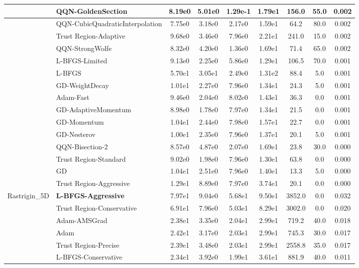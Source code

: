 \documentclass[10pt]{article}
\begin{document}
\begin{longtable}{|l|l|c|c|c|c|c|c|c|}
 & QQN-GoldenSection & 8.19e0 & 5.01e0 & 1.29e-1 & 1.79e1 & 156.0 & 55.0 & 0.002 \\
\hline
 & QQN-CubicQuadraticInterpolation & 7.75e0 & 3.18e0 & 2.17e0 & 1.59e1 & 64.2 & 80.0 & 0.002 \\
\hline
 & Trust Region-Adaptive & 9.68e0 & 3.46e0 & 7.96e0 & 2.21e1 & 241.0 & 15.0 & 0.002 \\
\hline
 & QQN-StrongWolfe & 8.32e0 & 4.20e0 & 1.36e0 & 1.69e1 & 71.4 & 65.0 & 0.002 \\
\hline
 & L-BFGS-Limited & 9.13e0 & 2.25e0 & 5.86e0 & 1.29e1 & 106.5 & 70.0 & 0.001 \\
\hline
 & L-BFGS & 5.70e1 & 3.05e1 & 2.49e0 & 1.31e2 & 88.4 & 5.0 & 0.001 \\
\hline
 & GD-WeightDecay & 1.01e1 & 2.27e0 & 7.96e0 & 1.34e1 & 24.3 & 5.0 & 0.001 \\
\hline
 & Adam-Fast & 9.46e0 & 2.04e0 & 8.02e0 & 1.43e1 & 36.3 & 0.0 & 0.001 \\
\hline
 & GD-AdaptiveMomentum & 8.98e0 & 1.78e0 & 7.97e0 & 1.34e1 & 21.5 & 0.0 & 0.001 \\
\hline
 & GD-Momentum & 1.04e1 & 2.44e0 & 7.98e0 & 1.57e1 & 22.7 & 0.0 & 0.001 \\
\hline
 & GD-Nesterov & 1.00e1 & 2.35e0 & 7.96e0 & 1.37e1 & 20.1 & 5.0 & 0.001 \\
\hline
 & QQN-Bisection-2 & 8.57e0 & 4.87e0 & 2.07e0 & 1.69e1 & 23.8 & 30.0 & 0.000 \\
\hline
 & Trust Region-Standard & 9.02e0 & 1.98e0 & 7.96e0 & 1.30e1 & 63.8 & 0.0 & 0.000 \\
\hline
 & GD & 1.04e1 & 2.51e0 & 7.96e0 & 1.40e1 & 13.3 & 5.0 & 0.000 \\
\hline
 & Trust Region-Aggressive & 1.29e1 & 8.89e0 & 7.97e0 & 3.74e1 & 20.1 & 0.0 & 0.000 \\
Rastrigin\_5D & \textbf{L-BFGS-Aggressive} & 7.97e1 & 9.04e0 & 5.68e1 & 9.50e1 & 3852.0 & 0.0 & 0.032 \\
\hline
 & Trust Region-Conservative & 6.91e1 & 7.96e0 & 5.03e1 & 8.29e1 & 3002.0 & 0.0 & 0.020 \\
\hline
 & Adam-AMSGrad & 2.38e1 & 3.35e0 & 2.04e1 & 2.99e1 & 719.2 & 40.0 & 0.018 \\
\hline
 & Adam & 2.42e1 & 3.17e0 & 2.03e1 & 2.99e1 & 745.3 & 30.0 & 0.017 \\
\hline
 & Trust Region-Precise & 2.39e1 & 3.48e0 & 2.03e1 & 2.99e1 & 2558.8 & 35.0 & 0.017 \\
\hline
 & L-BFGS-Conservative & 2.34e1 & 3.92e0 & 1.99e1 & 3.61e1 & 881.9 & 40.0 & 0.011 \\

\end{longtable}
\end{document}
